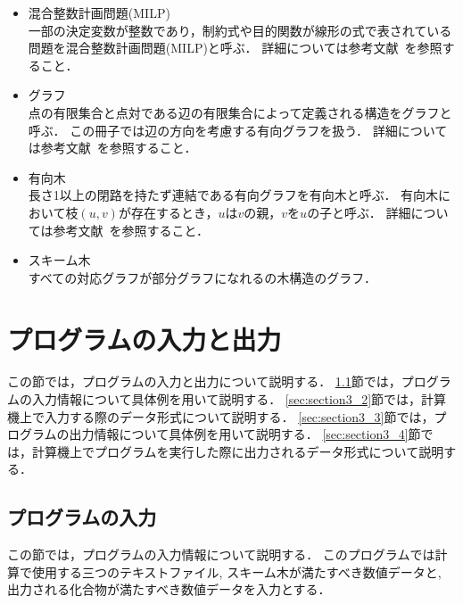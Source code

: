 \documentclass[11pt,titlepage,dvipdfmx,twoside]{jarticle}
\begin{document}
\begin{itemize}
\item 混合整数計画問題(MILP)\\
一部の決定変数が整数であり，制約式や目的関数が線形の式で表されている問題を混合整数計画問題(MILP)と呼ぶ．
詳細については参考文献~\cite{LP}を参照すること．


\item グラフ\\
点の有限集合と点対である辺の有限集合によって定義される構造をグラフと呼ぶ．
この冊子では辺の方向を考慮する有向グラフを扱う．
詳細については参考文献~\cite{graph}を参照すること．

\item 有向木\\
長さ1以上の閉路を持たず連結である有向グラフを有向木と呼ぶ．
有向木において枝$(u,v)$が存在するとき，$u$は$v$の親，$v$を$u$の子と呼ぶ．
詳細については参考文献~\cite{graph}を参照すること．


\item スキーム木\\
すべての対応グラフが部分グラフになれるの木構造のグラフ．

\end{itemize}


\section{プログラムの入力と出力}
\label{sec:InOut}

この節では，プログラムの入力と出力について説明する．
\ref{sec:section3_1}節では，プログラムの入力情報について具体例を用いて説明する．
\ref{sec:section3_2}節では，計算機上で入力する際のデータ形式について説明する．
\ref{sec:section3_3}節では，プログラムの出力情報について具体例を用いて説明する．
\ref{sec:section3_4}節では，計算機上でプログラムを実行した際に出力されるデータ形式について説明する．

\subsection{プログラムの入力}
\label{sec:section3_1}

この節では，プログラムの入力情報について説明する．
このプログラムでは計算で使用する三つのテキストファイル,
スキーム木が満たすべき数値データと,
出力される化合物が満たすべき数値データを入力とする．
\end{document}
